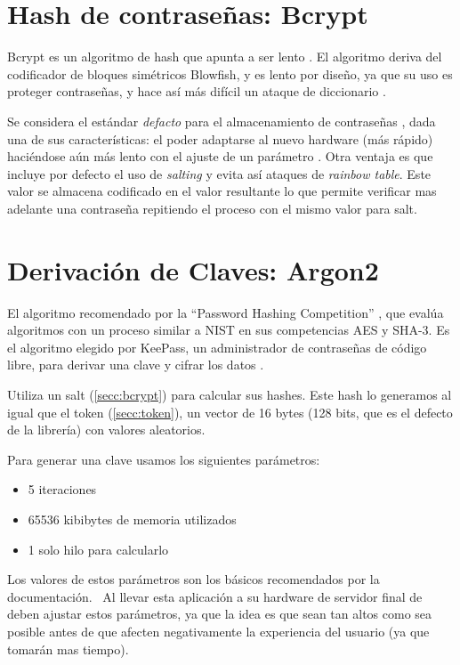 \section{Hash de contraseñas: Bcrypt}\label{secc:bcrypt}

Bcrypt es un algoritmo de hash que apunta a ser lento
\autocite{stackexchange-bcrypt}.
El algoritmo deriva del codificador de bloques simétricos Blowfish, y es lento
por diseño, ya que su uso es proteger contraseñas, y hace así más difícil un
ataque de diccionario \autocite{auth0-bcrypt}.

Se considera el estándar \emph{defacto} para el almacenamiento de contraseñas
\autocite{itblog-pwhash}, dada una de sus características: el poder adaptarse
al nuevo hardware (más rápido) haciéndose aún más lento con el ajuste de un
parámetro \autocite{auth0-bcrypt}. 
Otra ventaja es que incluye por defecto el uso de \emph{salting}
\autocite{stackexchange-bcryptsalt} y evita así ataques de \emph{rainbow
table}.
Este valor se almacena codificado en el valor resultante lo que permite
verificar mas adelante una contraseña repitiendo el proceso con el mismo
valor para salt.

\section{Derivación de Claves: Argon2}\label{secc:argon}

El algoritmo recomendado por la ``Password Hashing Competition'' \autocite{phc},
que evalúa algoritmos con un proceso similar a NIST en sus competencias AES y
SHA-3.
Es el algoritmo elegido por KeePass, un administrador de contraseñas de código
libre, para derivar una clave y cifrar los datos \autocite{keepass}.

Utiliza un salt (\autoref{secc:bcrypt}) para calcular sus hashes.
Este hash lo generamos al igual que el token (\autoref{secc:token}),
un vector de 16 bytes (128 bits, que es el defecto de la librería) con valores
aleatorios.

Para generar una clave usamos los siguientes parámetros:
\begin{itemize}
	\item 5 iteraciones
	\item 65536 kibibytes de memoria utilizados
	\item 1 solo hilo para calcularlo
\end{itemize}

Los valores de estos parámetros son los básicos recomendados por la 
documentación.~\cite{argon2-jvm}
Al llevar esta aplicación a su hardware de servidor final de deben ajustar estos
parámetros, ya que la idea es que sean tan altos como sea posible antes de que
afecten negativamente la experiencia del usuario (ya que tomarán mas tiempo).

